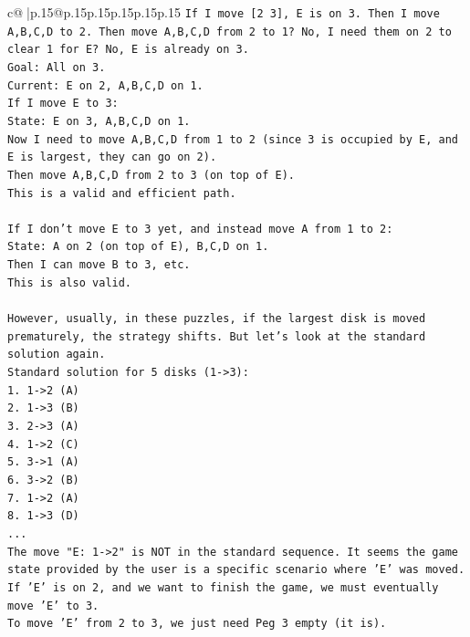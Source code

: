\documentclass{article}
\begin{document}
{\begin{supertabular}{c@{$\;$}|p{.15\linewidth}@{}p{.15\linewidth}p{.15\linewidth}p{.15\linewidth}p{.15\linewidth}p{.15\linewidth}}
{{{\texttt{If I move {[}2 3{]}, E is on 3. Then I move A,B,C,D to 2. Then move A,B,C,D from 2 to 1? No, I need them on 2 to clear 1 for E? No, E is already on 3.} \\
\texttt{Goal: All on 3.} \\
\texttt{Current: E on 2, A,B,C,D on 1.} \\
\texttt{If I move E to 3:} \\
\texttt{State: E on 3, A,B,C,D on 1.} \\
\texttt{Now I need to move A,B,C,D from 1 to 2 (since 3 is occupied by E, and E is largest, they can go on 2).} \\
\texttt{Then move A,B,C,D from 2 to 3 (on top of E).} \\
\texttt{This is a valid and efficient path.} \\
\\ 
\texttt{If I don't move E to 3 yet, and instead move A from 1 to 2:} \\
\texttt{State: A on 2 (on top of E), B,C,D on 1.} \\
\texttt{Then I can move B to 3, etc.} \\
\texttt{This is also valid.} \\
\\ 
\texttt{However, usually, in these puzzles, if the largest disk is moved prematurely, the strategy shifts. But let's look at the standard solution again.} \\
\texttt{Standard solution for 5 disks (1{-}>3):} \\
\texttt{1. 1{-}>2 (A)} \\
\texttt{2. 1{-}>3 (B)} \\
\texttt{3. 2{-}>3 (A)} \\
\texttt{4. 1{-}>2 (C)} \\
\texttt{5. 3{-}>1 (A)} \\
\texttt{6. 3{-}>2 (B)} \\
\texttt{7. 1{-}>2 (A)} \\
\texttt{8. 1{-}>3 (D)} \\
\texttt{...} \\
\texttt{The move "E: 1{-}>2" is NOT in the standard sequence. It seems the game state provided by the user is a specific scenario where 'E' was moved.} \\
\texttt{If 'E' is on 2, and we want to finish the game, we must eventually move 'E' to 3.} \\
\texttt{To move 'E' from 2 to 3, we just need Peg 3 empty (it is).} \\
}}}
\end{supertabular}}
\end{document}
